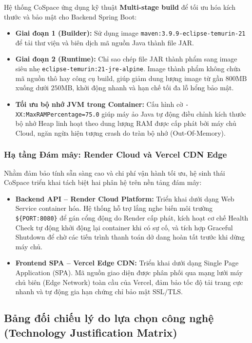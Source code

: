 Hệ thống CoSpace ứng dụng kỹ thuật \textbf{Multi-stage build} để tối ưu hóa kích thước và bảo mật cho Backend Spring Boot:
\begin{itemize}
    \item \textbf{Giai đoạn 1 (Builder):} Sử dụng image \texttt{maven:3.9.9-eclipse-temurin-21} để tải thư viện và biên dịch mã nguồn Java thành file JAR.
    \item \textbf{Giai đoạn 2 (Runtime):} Chỉ sao chép file JAR thành phẩm sang image siêu nhẹ \texttt{eclipse-temurin:21-jre-alpine}. Image thành phẩm không chứa mã nguồn thô hay công cụ build, giúp giảm dung lượng image từ gần $800\text{MB}$ xuống dưới $250\text{MB}$, khởi động nhanh và hạn chế tối đa lỗ hổng bảo mật.
    \item \textbf{Tối ưu bộ nhớ JVM trong Container:} Cấu hình cờ \texttt{-XX:MaxRAMPercentage=75.0} giúp máy ảo Java tự động điều chỉnh kích thước bộ nhớ Heap linh hoạt theo dung lượng RAM được cấp phát bởi máy chủ Cloud, ngăn ngừa hiện tượng crash do tràn bộ nhớ (Out-Of-Memory).
\end{itemize}

\subsubsection{Hạ tầng Đám mây: Render Cloud và Vercel CDN Edge}

Nhằm đảm bảo tính sẵn sàng cao và chi phí vận hành tối ưu, hệ sinh thái CoSpace triển khai tách biệt hai phân hệ trên nền tảng đám mây:
\begin{itemize}
    \item \textbf{Backend API -- Render Cloud Platform:} Triển khai dưới dạng Web Service container hóa. Hệ thống hỗ trợ lắng nghe biến môi trường \texttt{\$\{PORT:8080\}} để gán cổng động do Render cấp phát, kích hoạt cơ chế Health Check tự động khởi động lại container khi có sự cố, và tích hợp Graceful Shutdown để chờ các tiến trình thanh toán dở dang hoàn tất trước khi dừng máy chủ.
    \item \textbf{Frontend SPA -- Vercel Edge CDN:} Triển khai dưới dạng Single Page Application (SPA). Mã nguồn giao diện được phân phối qua mạng lưới máy chủ biên (Edge Network) toàn cầu của Vercel, đảm bảo tốc độ tải trang cực nhanh và tự động gia hạn chứng chỉ bảo mật SSL/TLS.
\end{itemize}

\subsection{Bảng đối chiếu lý do lựa chọn công nghệ (Technology Justification Matrix)}

